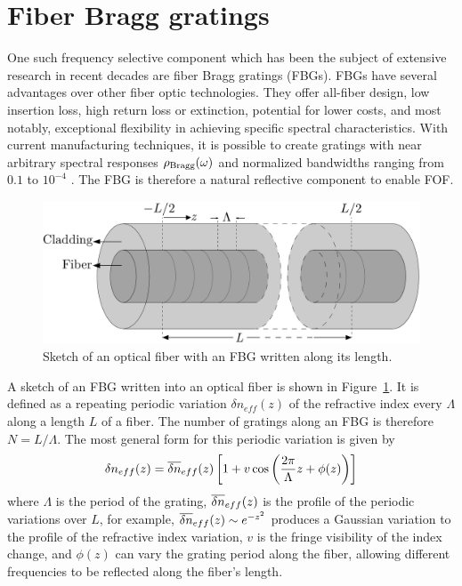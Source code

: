 \section*{Fiber Bragg gratings}
\label{sec:FBG}
%
One such frequency selective component which has been the subject of extensive research in recent decades are fiber Bragg gratings (FBGs). FBGs have several advantages over other fiber optic technologies. They offer all-fiber design, low insertion loss, high return loss or extinction,  potential for lower costs, and most notably, exceptional flexibility in achieving specific spectral characteristics. With current manufacturing techniques, it is possible to create gratings with near arbitrary spectral responses $\rho_\text{Bragg}(\omega)$ and normalized bandwidths ranging from $0.1$ to $10^{-4}$ \cite{erdogan1997fiber}. The FBG is therefore a natural reflective component to enable FOF.
%
\begin{figure}
    \centering
    
    \includegraphics[width=0.7\linewidth]{Images/Introduction/FBG.pdf}
    
    \caption{Sketch of an optical fiber with an FBG written along its length.}
    
    \label{fig:FBG}
\end{figure}
%
\par
%
A sketch of an FBG written into an optical fiber is shown in Figure~\ref{fig:FBG}. It is defined as a repeating periodic variation $\delta n_{eff}(z)$ of the refractive index every $\Lambda$ along a length $L$ of a fiber. The number of gratings along an FBG is therefore $N = L/\Lambda$. The most general form for this periodic variation is given by
%
\begin{equation}
\label{eq:dneff}
    \delta n_{eff}(z) = \overline{\delta n}_{eff}(z) \left[ 1 + v \cos{\left( \frac{2 \pi}{\Lambda} z + \phi(z) \right)} \right]
\end{equation}
%
where $\Lambda$ is the period of the grating, $\overline{\delta n}_{eff}(z)$ is the profile of the periodic variations over $L$, for example, $\overline{\delta n}_{eff}(z) \sim e^{-z^2}$ produces a Gaussian variation to the profile of the refractive index variation, $v$ is the fringe visibility of the index change, and $\phi(z)$ can vary the grating period along the fiber, allowing different frequencies to be reflected along the fiber's length.
